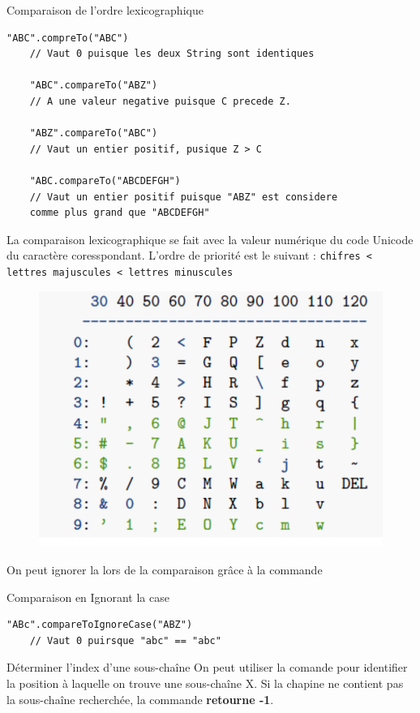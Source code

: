 \documentclass{report}
\begin{document}
\begin{EExample*}{Comparaison de l'ordre lexicographique}{}
\begin{lstlisting}[style=JavaDraculaWhite]
	"ABC".compreTo("ABC")
	// Vaut 0 puisque les deux String sont identiques 

	"ABC".compareTo("ABZ") 
	// A une valeur negative puisque C precede Z.

	"ABZ".compareTo("ABC")
	// Vaut un entier positif, pusique Z > C

	"ABC.compareTo("ABCDEFGH")
	// Vaut un entier positif puisque "ABZ" est considere
	comme plus grand que "ABCDEFGH"
\end{lstlisting}
\end{EExample*}

\begin{note}
La comparaison lexicographique se fait avec la valeur 
numérique du code Unicode du caractère coresspondant. L'ordre
de priorité est le suivant : 
\texttt{\footnotesize{chifres < lettres majuscules < lettres minuscules}}
\end{note}

\begin{figure}[H]
\centering

\includegraphics[width=0.45\linewidth]{StringLexico}
\end{figure}

\begin{note}
On peut ignorer la lors de la comparaison grâce à la commande
\end{note}

\begin{EExample*}{Comparaison en Ignorant la case}{}
\begin{lstlisting}[style=JavaDraculaWhite]
	"ABc".compareToIgnoreCase("ABZ") 
	// Vaut 0 puirsque "abc" == "abc"
\end{lstlisting}
\end{EExample*}

\begin{Syntaxe*}{Déterminer l'index d'une sous-chaîne}{}
On peut utiliser la comande  pour identifier la position à laquelle on trouve une sous-chaîne X. Si la chapine ne contient pas la
sous-chaîne recherchée, la commande \textbf{retourne -1}.
\end{Syntaxe*}
\end{document}

